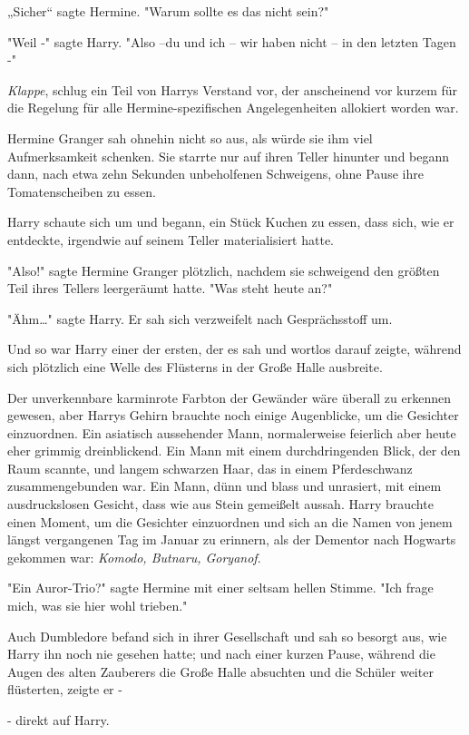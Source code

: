 {„Sicher“ sagte Hermine. "Warum sollte es das nicht sein?"

"Weil -" sagte Harry. "Also --du und ich -- wir haben nicht -- in den letzten Tagen -"

\emph{Klappe}, schlug ein Teil von Harrys Verstand vor, der anscheinend vor kurzem für die Regelung für alle Hermine-spezifischen Angelegenheiten allokiert worden war.

Hermine Granger sah ohnehin nicht so aus, als würde sie ihm viel Aufmerksamkeit schenken. Sie starrte nur auf ihren Teller hinunter und begann dann, nach etwa zehn Sekunden unbeholfenen Schweigens, ohne Pause ihre Tomatenscheiben zu essen.

Harry schaute sich um und begann, ein Stück Kuchen zu essen, dass sich, wie er entdeckte, irgendwie auf seinem Teller materialisiert hatte.

"Also!" sagte Hermine Granger plötzlich, nachdem sie schweigend den größten Teil ihres Tellers leergeräumt hatte. "Was steht heute an?"

"Ähm…" sagte Harry. Er sah sich verzweifelt nach Gesprächsstoff um.

Und so war Harry einer der ersten, der es sah und wortlos darauf zeigte, während sich plötzlich eine Welle des Flüsterns in der Große Halle ausbreite.

Der unverkennbare karminrote Farbton der Gewänder wäre überall zu erkennen gewesen, aber Harrys Gehirn brauchte noch einige Augenblicke, um die Gesichter einzuordnen. Ein asiatisch aussehender Mann, normalerweise feierlich aber heute eher grimmig dreinblickend. Ein Mann mit einem durchdringenden Blick, der den Raum scannte, und langem schwarzen Haar, das in einem Pferdeschwanz zusammengebunden war. Ein Mann, dünn und blass und unrasiert, mit einem ausdruckslosen Gesicht, dass wie aus Stein gemeißelt aussah. Harry brauchte einen Moment, um die Gesichter einzuordnen und sich an die Namen von jenem längst vergangenen Tag im Januar zu erinnern, als der Dementor nach Hogwarts gekommen war: \emph{Komodo, Butnaru, Goryanof}.

"Ein Auror-Trio?" sagte Hermine mit einer seltsam hellen Stimme. "Ich frage mich, was sie hier wohl trieben."

Auch Dumbledore befand sich in ihrer Gesellschaft und sah so besorgt aus, wie Harry ihn noch nie gesehen hatte; und nach einer kurzen Pause, während die Augen des alten Zauberers die Große Halle absuchten und die Schüler weiter flüsterten, zeigte er -

- direkt auf Harry.

}
